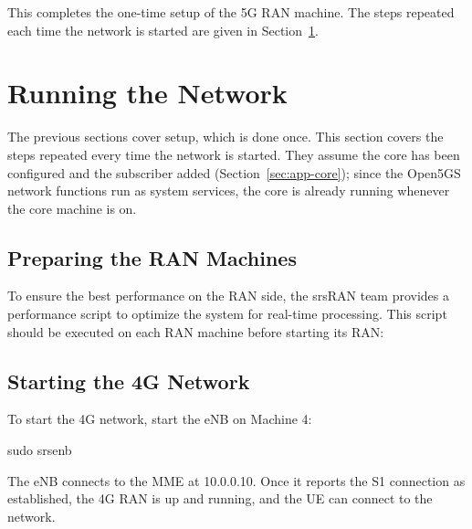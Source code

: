 This completes the one-time setup of the 5G \gls{RAN} machine. The steps repeated each time the network is started are given in Section~\ref{sec:app-running}.

\section{Running the Network}
\label{sec:app-running}

The previous sections cover setup, which is done once. This section covers the steps repeated every time the network is started. They assume the core has been configured and the subscriber added (Section~\ref{sec:app-core}); since the Open5GS network functions run as system services, the core is already running whenever the core machine is on.

\subsection{Preparing the RAN Machines}
To ensure the best performance on the \gls{RAN} side, the srsRAN team provides a performance script to optimize the system for real-time processing. This script should be executed on each \gls{RAN} machine before starting its \gls{RAN}:


\subsection{Starting the 4G Network}
\label{sec:app-start-4g}
To start the 4G network, start the \gls{eNB} on Machine 4:
\begin{code}
sudo srsenb
\end{code}
The \gls{eNB} connects to the \gls{MME} at 10.0.0.10. Once it reports the S1 connection as established, the 4G \gls{RAN} is up and running, and the \gls{UE} can connect to the network.

